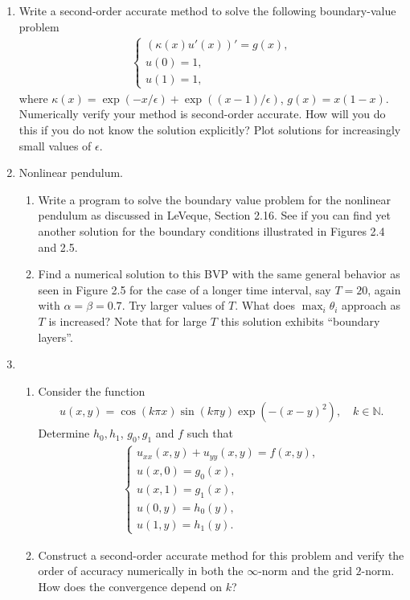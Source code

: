 \documentclass[10pt]{amsart}
\begin{document}
  \begin{enumerate}[label={\bf Problem~{\arabic*}:}]
\item Write a second-order accurate method to solve the following
  boundary-value problem
  \begin{align*}
    \begin{cases}
      (\kappa(x) u'(x))' = g(x),\\
      u(0) = 1,\\
      u(1) = 1,
    \end{cases}
  \end{align*}
  where $\kappa(x) = \exp(-x/\epsilon) + \exp( (x-1)/\epsilon)$, $g(x) =
  x(1-x)$.  Numerically verify your method is second-order accurate.
  How will you do this if you do not know the solution explicitly?
  Plot solutions for increasingly small values of $\epsilon$.

  \mline

\item Nonlinear pendulum.
  \begin{enumerate}
    \item Write a program to solve the boundary value problem for the
nonlinear pendulum as discussed in LeVeque, Section 2.16.  See if you can find yet
another solution for the boundary conditions illustrated in Figures 2.4
and 2.5.

\item Find a numerical solution to this BVP with the same
general behavior as seen in Figure 2.5 for the case of a longer time
interval, say $T=20$, again with $\alpha=\beta=0.7$.  Try larger values of
$T$.  What does $\max_i \theta_i$ approach as $T$ is increased?  Note that
for large $T$ this solution  exhibits ``boundary layers''.
\end{enumerate}
\mline

\item
  \begin{enumerate}
  \item Consider the function
    \begin{align}\label{u}
      u(x,y) = \cos (k \pi x) \sin(k\pi y)
      \exp(-(x - y)^2 ), \quad k \in \mathbb N.
    \end{align}
    Determine $h_0,h_1$, $g_0,g_1$ and $f$ such
  that
  \begin{align}\label{poisson}
    \begin{cases}
      u_{xx}(x,y) + u_{yy}(x,y) = f(x,y),\\
      u(x,0) = g_0(x),\\
      u(x,1) = g_1(x),\\
      u(0,y) = h_0(y),\\
      u(1,y) = h_1(y).
      \end{cases}
  \end{align}
  \item Construct a second-order accurate method for this problem and
    verify the order of accuracy numerically in both the $\infty$-norm
    and the grid $2$-norm.  How does the convergence depend on $k$?
  \end{enumerate}


\end{enumerate}
\end{document}
